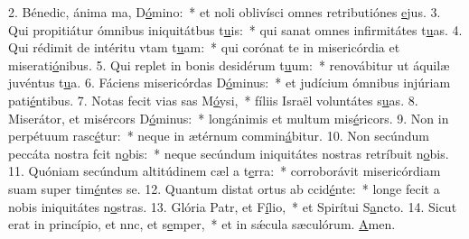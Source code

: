 2. Bénedic, ánima ma, D\uline{ó}mino:~* et noli oblivísci omnes retributiónes \uline{e}jus.
3. Qui propitiátur ómnibus iniquitátbus t\uline{u}is:~* qui sanat omnes infirmitátes t\uline{u}as.
4. Qui rédimit de intéritu vtam t\uline{u}am:~* qui corónat te in misericórdia et miserati\uline{ó}nibus.
5. Qui replet in bonis desidérum t\uline{u}um:~* renovábitur ut áquilæ juvéntus t\uline{u}a.
6. Fáciens misericórdas D\uline{ó}minus:~* et judícium ómnibus injúriam pati\uline{é}ntibus.
7. Notas fecit vias sas M\uline{ó}ysi,~* fíliis Israël voluntátes s\uline{u}as.
8. Miserátor, et misércors D\uline{ó}minus:~* longánimis et multum mis\uline{é}ricors.
9. Non in perpétuum rasc\uline{é}tur:~* neque in ætérnum commin\uline{á}bitur.
10. Non secúndum peccáta nostra fcit n\uline{o}bis:~* neque secúndum iniquitátes nostras retríbuit n\uline{o}bis.
11. Quóniam secúndum altitúdinem cæl a t\uline{e}rra:~* corroborávit misericórdiam suam super tim\uline{é}ntes se.
12. Quantum distat ortus ab ccid\uline{é}nte:~* longe fecit a nobis iniquitátes n\uline{o}stras.
13. Glória Patr, et F\uline{í}lio,~* et Spirítui S\uline{a}ncto.
14. Sicut erat in princípio, et nnc, et s\uline{e}mper,~* et in sǽcula sæculórum. \uline{A}men.
